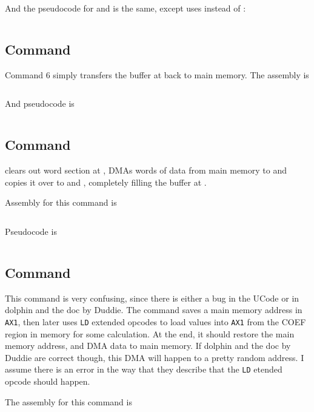 \inputminted[fontsize=\small]{asm}{../ucode/command_4.asm}

And the pseudocode for  and  is the same, except  uses  instead of :

\inputminted{c}{../ucode/command_459.c}

\subsection{Command }
Command 6 simply transfers the buffer at  back to main memory. The assembly is 

\inputminted[fontsize=\small]{asm}{../ucode/command_6.asm}

And pseudocode is

\inputminted{c}{../ucode/command_6.c}

\subsection{Command }
clears out  word section at , DMAs  words of data from main memory to  and copies it over to  and , completely filling the buffer at . 

Assembly for this command is

\inputminted[fontsize=\small]{asm}{../ucode/command_7.asm}

Pseudocode is

\inputminted{c}{../ucode/command_7.c}

\subsection{Command }
This command is very confusing, since there is either a bug in the UCode or in dolphin and the doc by Duddie. The command saves a main memory address in \texttt{AX1}, then later uses \texttt{LD} extended opcodes to load values into \texttt{AX1} from the COEF region in memory for some calculation. At the end, it should restore the main memory address, and DMA data to main memory. If dolphin and the doc by Duddie are correct though, this DMA will happen to a pretty random address. I assume there is an error in the way that they describe that the \texttt{LD} etended opcode should happen.

The assembly for this command is 

\inputminted[fontsize=\small]{asm}{../ucode/command_8.asm}

